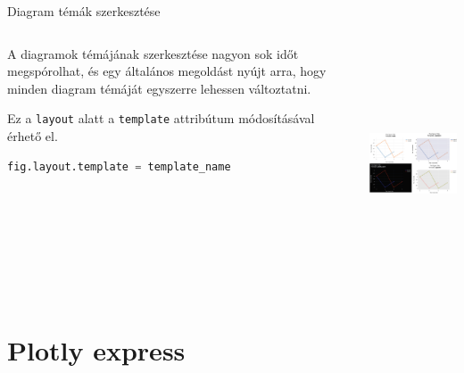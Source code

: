 \documentclass[english, aspectratio=169]{beamer}
\makeatletter
\let\origtableofcontents=\tableofcontents
\def\tableofcontents{\@ifnextchar[{\origtableofcontents}{\gobbletableofcontents}}
\def\gobbletableofcontents#1{\origtableofcontents}
\makeatother
\begin{document}
\begin{frame}[fragile]{Diagram témák szerkesztése}
	\begin{columns}
		\begin{column}{.5\textwidth}
			A diagramok témájának szerkesztése nagyon sok időt megspórolhat, és egy általános megoldást nyújt arra, hogy minden diagram témáját egyszerre lehessen változtatni.\par\smallskip
			Ez a \texttt{layout} alatt a \texttt{template} attribútum módosításával érhető el. 
			\begin{lstlisting}[language=python]
fig.layout.template = template_name
			\end{lstlisting}	
		\end{column}
		\begin{column}{.5\textwidth}
			\begin{center}
				\includegraphics[width=7cm, height=7cm, keepaspectratio]{images/plots_7.png}
			\end{center}
		\end{column}
	\end{columns}
\end{frame}

\section{Plotly express}

\begin{frame}{}
	\tableofcontents[currentsection]
\end{frame}
\end{document}
